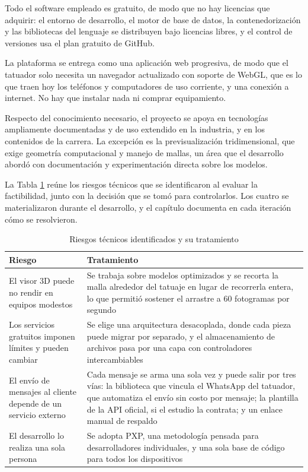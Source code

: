 \documentclass[12pt,letterpaper,oneside]{report}
\begin{document}
Todo el software empleado es gratuito, de modo que no hay licencias que adquirir: el entorno de desarrollo, el motor de base de datos, la contenedorización y las bibliotecas del lenguaje se distribuyen bajo licencias libres, y el control de versiones usa el plan gratuito de GitHub.

La plataforma se entrega como una aplicación web progresiva, de modo que el tatuador solo necesita un navegador actualizado con soporte de WebGL, que es lo que traen hoy los teléfonos y computadores de uso corriente, y una conexión a internet. No hay que instalar nada ni comprar equipamiento.

Respecto del conocimiento necesario, el proyecto se apoya en tecnologías ampliamente documentadas y de uso extendido en la industria, y en los contenidos de la carrera. La excepción es la previsualización tridimensional, que exige geometría computacional y manejo de mallas, un área que el desarrollo abordó con documentación y experimentación directa sobre los modelos.

La Tabla \ref{tab:riesgostecnicos} reúne los riesgos técnicos que se identificaron al evaluar la factibilidad, junto con la decisión que se tomó para controlarlos. Los cuatro se materializaron durante el desarrollo, y el capítulo documenta en cada iteración cómo se resolvieron.

\begin{table}[H]
  \centering
  \caption{Riesgos técnicos identificados y su tratamiento}
  \label{tab:riesgostecnicos}
  \renewcommand{\arraystretch}{1.2}
  \begin{tabular}{|p{4.2cm}|p{9cm}|}
    \hline
    \textbf{Riesgo} & \textbf{Tratamiento} \\
    \hline
    El visor 3D puede no rendir en equipos modestos & Se trabaja sobre modelos optimizados y se recorta la malla alrededor del tatuaje en lugar de recorrerla entera, lo que permitió sostener el arrastre a 60 fotogramas por segundo \\ \hline
    Los servicios gratuitos imponen límites y pueden cambiar & Se elige una arquitectura desacoplada, donde cada pieza puede migrar por separado, y el almacenamiento de archivos pasa por una capa con controladores intercambiables \\ \hline
    El envío de mensajes al cliente depende de un servicio externo & Cada mensaje se arma una sola vez y puede salir por tres vías: la biblioteca que vincula el WhatsApp del tatuador, que automatiza el envío sin costo por mensaje; la plantilla de la API oficial, si el estudio la contrata; y un enlace manual de respaldo \\ \hline
    El desarrollo lo realiza una sola persona & Se adopta PXP, una metodología pensada para desarrolladores individuales, y una sola base de código para todos los dispositivos \\ \hline
  \end{tabular}
\end{table}
\end{document}
